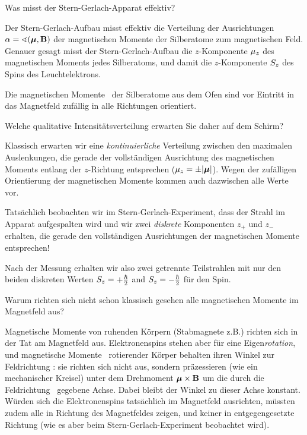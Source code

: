 \begin{frage}
 Was misst der Stern-Gerlach-Apparat effektiv?
\end{frage}
\begin{antw}
 Der Stern-Gerlach-Aufbau misst effektiv die Verteilung der Ausrichtungen $\alpha = \sphericalangle(\boldsymbol{\mu}, \mathbf{B})$ der magnetischen Momente der Silberatome zum magnetischen Feld. Genauer gesagt misst der Stern-Gerlach-Aufbau die $z$-Komponente $\mu_z$ des magnetischen Moments jedes Silberatoms, und damit die $z$-Komponente $S_z$ des Spins des Leuchtelektrons.
\end{antw}


Die magnetischen Momente \magnmom\ der Silberatome aus dem Ofen sind vor Eintritt in das Magnetfeld zuf\"allig in alle Richtungen orientiert.

\begin{frage}
 Welche qualitative Intensit\"atsverteilung erwarten Sie daher auf dem Schirm?
\end{frage}
\begin{antw}
 Klassisch erwarten wir eine \emph{kontinuierliche} Verteilung zwischen den maximalen Auslenkungen, die gerade der vollst\"andigen Ausrichtung des magnetischen Moments entlang der $z$-Richtung entsprechen ($\mu_z = \pm |\boldsymbol{\mu}|$). Wegen der zuf\"alligen Orientierung der magnetischen Momente kommen auch dazwischen alle Werte vor.
\end{antw}

\begin{erg}
 Tats\"achlich beobachten wir im Stern-Gerlach-Experiment, dass der Strahl im Apparat aufgespalten wird und wir zwei \emph{diskrete} Komponenten $z_+$ und $z_-$ erhalten, die gerade den vollst\"andigen Ausrichtungen der magnetischen Momente entsprechen!

Nach der Messung erhalten wir also zwei getrennte Teilstrahlen mit nur den beiden diskreten Werten $S_z = +\frac{\hbar}{2}$ and $S_z = -\frac{\hbar}{2}$ f\"ur den Spin.
\end{erg}


\begin{zfrage}
 Warum richten sich nicht schon klassisch gesehen alle magnetischen Momente im Magnetfeld aus? 
\end{zfrage}
\begin{antw}
 Magnetische Momente von ruhenden K\"orpern (Stabmagnete z.B.) richten sich in der Tat am Magnetfeld aus. Elektronenspins stehen aber f\"ur eine Eigen\emph{rotation}, und magnetische Momente \magnmom\ rotierender K\"orper behalten ihren Winkel zur Feldrichtung \magnf: sie richten sich nicht aus, sondern pr\"azessieren (wie ein mechanischer Kreisel) unter dem Drehmoment $\boldsymbol{\mu} \times \mathbf{B}$ um die durch die Feldrichtung \magnf\ gegebene Achse. Dabei bleibt der Winkel zu dieser Achse konstant. W\"urden sich die Elektronenspins tats\"achlich im Magnetfeld ausrichten, m\"ussten zudem alle in Richtung des Magnetfeldes zeigen, und keiner in entgegengesetzte Richtung (wie es aber beim Stern-Gerlach-Experiment beobachtet wird).
\end{antw}

